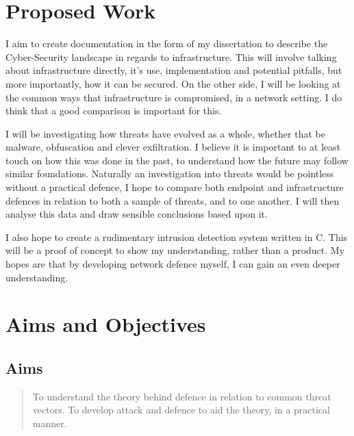 \section{Proposed Work}
\label{proposed}
I aim to create documentation in the form of my dissertation to describe the Cyber-Security landscape in regards to infrastructure. 
This will involve talking about infrastructure directly, it's use, implementation and potential pitfalls, but more importantly, how it can be secured.
On the other side, I will be looking at the common ways that infrastructure is compromised, in a network setting. 
I do think that a good comparison is important for this. 

I will be investigating how threats have evolved as a whole,
whether that be malware, obfuscation and clever exfiltration. I believe it is important to at least touch on how this was done in the past, 
to understand how the future may follow similar foundations. Naturally an investigation into threats would be pointless without a practical defence, 
I hope to compare both endpoint and infrastructure defences in relation to both a sample of threats, and to one another. I will then analyse this data and draw sensible conclusions based upon it.

I also hope to create a rudimentary intrusion detection system written in C. This will be a proof of concept to show my understanding, rather than a product. My hopes are that by developing network defence myself, 
I can gain an even deeper understanding.

\section{Aims and Objectives}
\subsection{Aims}
\begin{quote}
	To understand the theory behind defence in relation to common threat vectors.
	To develop attack and defence to aid the theory, in a practical manner.
\end{quote}

